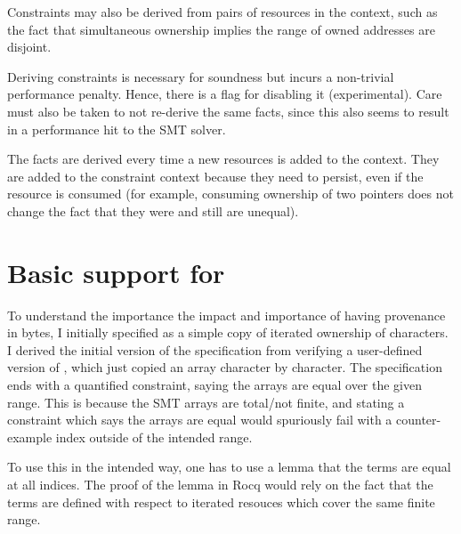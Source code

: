 
Constraints may also be derived from pairs of resources in the context, such as
the fact that simultaneous ownership implies the range of owned addresses are
disjoint.


Deriving constraints is necessary for soundness but incurs a non-trivial
performance penalty. Hence, there is a flag for disabling it (experimental).
Care must also be taken to not re-derive the same facts, since this also seems
to result in a performance hit to the SMT
solver.


The facts are derived every time a new resources is added to the context.
They are added to the constraint context because they need to persist,
even if the resource is consumed (for example, consuming ownership
of two pointers does not change the fact that they were and still
are unequal).


\section{Basic support for }

To understand the importance the impact and importance of having provenance in
bytes, I initially specified  as a simple copy of iterated
ownership of characters. I derived the initial version of the specification
from verifying a user-defined version of , which just copied an
array character by character. The specification ends with a quantified constraint,
saying the arrays are equal over the given range. This is because the SMT arrays
are total/not finite, and stating a constraint which says the arrays are equal
would spuriously fail with a counter-example index outside of the intended range.


To use this in the intended way, one has to use a lemma that the terms are
equal at all indices. The proof of the lemma in Rocq would rely on the fact
that the terms are defined with respect to iterated resouces which cover the
same finite range.

